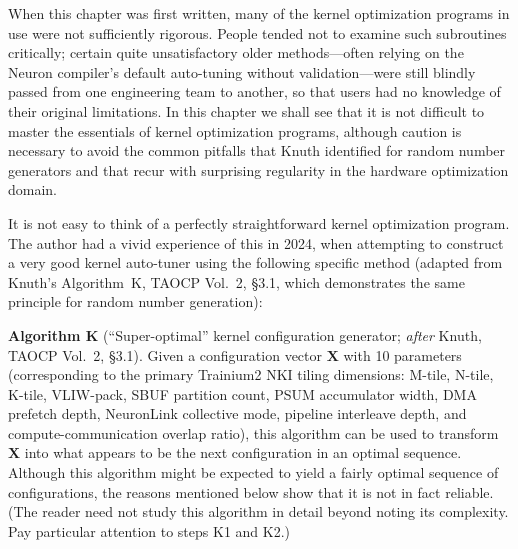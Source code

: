 \documentclass[12pt]{article}
\newcommand{\SBUF}{\textsc{SBUF}}                 %
\newcommand{\PSUM}{\textsc{PSUM}}                 %
\begin{document}
When this chapter was first written, many of the kernel optimization programs in use were not sufficiently rigorous. People tended not to examine such subroutines critically; certain quite unsatisfactory older methods---often relying on the Neuron compiler's default auto-tuning without validation---were still blindly passed from one engineering team to another, so that users had no knowledge of their original limitations. In this chapter we shall see that it is not difficult to master the essentials of kernel optimization programs, although caution is necessary to avoid the common pitfalls that Knuth identified for random number generators and that recur with surprising regularity in the hardware optimization domain.

It is not easy to think of a perfectly straightforward kernel optimization program. The author had a vivid experience of this in 2024, when attempting to construct a very good kernel auto-tuner using the following specific method (adapted from Knuth's Algorithm~K, TAOCP Vol.~2, \S3.1, which demonstrates the same principle for random number generation):

\medskip

\noindent\textbf{Algorithm K} (``Super-optimal'' kernel configuration generator; \emph{after} Knuth, TAOCP Vol.~2, \S3.1). Given a configuration vector $\mathbf{X}$ with 10 parameters (corresponding to the primary Trainium2 NKI tiling dimensions: M-tile, N-tile, K-tile, VLIW-pack, \SBUF{} partition count, \PSUM{} accumulator width, DMA prefetch depth, NeuronLink collective mode, pipeline interleave depth, and compute-communication overlap ratio), this algorithm can be used to transform $\mathbf{X}$ into what appears to be the next configuration in an optimal sequence. Although this algorithm might be expected to yield a fairly optimal sequence of configurations, the reasons mentioned below show that it is not in fact reliable. (The reader need not study this algorithm in detail beyond noting its complexity. Pay particular attention to steps K1 and K2.)
\end{document}
